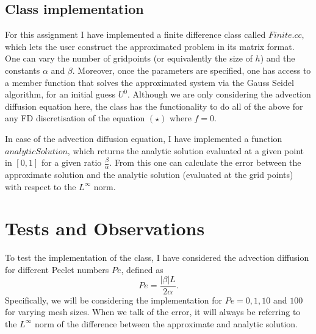 \documentclass[10pt]{article}
\begin{document}
\subsection{Class implementation}

For this assignment I have implemented a finite difference class called $\textit{Finite.cc}$, which lets the user construct the approximated problem in its matrix format. One can vary the number of gridpoints (or equivalently the size of $h$) and the constants $\alpha$ and $\beta$. Moreover, once the parameters are specified, one has access to a member function that solves the approximated system via the Gauss Seidel algorithm, for an initial guess $U^0$. Although we are only considering the advection diffusion equation here, the class has the functionality to do all of the above for any FD discretisation of the equation $(\star)$ where $f=0$.

In case of the advection diffusion equation, I have implemented a function $\textit{analyticSolution}$, which returns the analytic solution evaluated at a given point in $[0,1]$ for a given ratio $\frac{\beta}{\alpha}$. From this one can calculate the error between the approximate solution and the analytic solution (evaluated at the grid points) with respect to the $L^\infty$ norm.



\section{Tests and Observations}

To test the implementation of the class, I have considered the advection diffusion for different Peclet numbers $Pe$, defined as
\[ Pe = \frac{|\beta|L}{2\alpha}. \]
Specifically, we will be considering the implementation for $Pe = 0, 1, 10$ and $100$ for varying mesh sizes. When we talk of the error, it will always be referring to the $L^\infty$ norm of the difference between the approximate and analytic solution.
\end{document}
